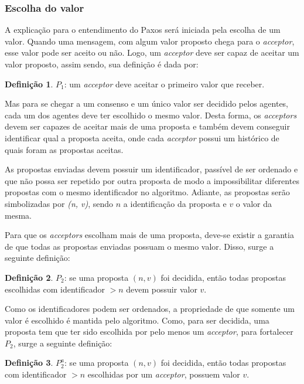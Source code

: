 \documentclass[
    12pt,
    openright, 
    oneside,
    a4paper,
    french,
    english,
    brazil
    ]{facom-ufu-abntex2}
\theoremstyle{definition}
\newtheorem{definition}{Definição}
\begin{document}
\subsubsection{Escolha do valor}
A explicação para o entendimento do Paxos será iniciada pela escolha de um valor. 
Quando uma mensagem, com algum valor proposto chega para o \emph{acceptor}, esse valor pode 
ser aceito ou não. Logo, um \emph{acceptor} deve ser capaz de aceitar um valor proposto, 
assim sendo, sua definição é dada por:

\begin{definition}
$P_1$: um \emph{acceptor} deve aceitar o primeiro valor que receber.
\end{definition}

Mas para se chegar a um consenso e um único valor ser decidido pelos agentes, cada um
dos agentes deve ter escolhido o mesmo valor. Desta forma, os \emph{acceptors} devem
ser capazes de aceitar mais de uma proposta e também devem conseguir identificar qual
a proposta aceita, onde cada \emph{acceptor} possui um histórico de quais foram as
propostas aceitas.

As propostas enviadas devem possuir um identificador, passível de ser ordenado e que não 
possa ser repetido por outra proposta de modo a impossibilitar diferentes propostas com o mesmo
identificador no algoritmo. Adiante, as propostas serão simbolizadas por 
\emph{(n, v)}, sendo $n$ a identificação da proposta e $v$ o valor da mesma.

Para que os \emph{acceptors} escolham mais de uma proposta, deve-se existir a garantia de
que todas as propostas enviadas possuam o mesmo valor. Disso, surge a seguinte definição:

\begin{definition}
$P_2$: se uma proposta $(n, v)$ foi decidida, então todas propostas escolhidas com 
identificador $>n$ devem possuir valor $v$.
\end{definition}

Como os identificadores podem ser ordenados, a propriedade de que somente um valor é escolhido
é mantida pelo algoritmo. Como, para ser decidida, uma proposta tem que ter sido escolhida
por pelo menos um \emph{acceptor}, para fortalecer $P_2$, surge a seguinte definição:

\begin{definition}
$P_2^a$: se uma proposta $(n, v)$ foi decidida, então todas propostas com identificador
$>n$ escolhidas por um \emph{acceptor}, possuem valor $v$.
\end{definition}
\end{document}
